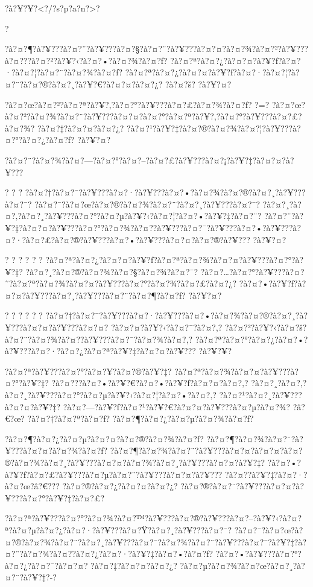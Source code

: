 \documentclass[11pt, openany]{book}
\begin{document}
{{{{{{{{{{{{{{{{{?à?¥?¥?\textless{}?/?s?p?a?n?\textgreater{}?

?

?à?¤?¶?à?¥???à?¤?¨?à?¥???à?¤?§?à?¤?¨?à?¥???à?¤?¤?à?¤?¾?à?¤?²?à?¥???à?¤???à?¤?²?à?¥?‹?à?¤?•?à?¤?¾?à?¤?ƒ?
?à?¤?ª?à?¤?¿?à?¤?¤?à?¥?ƒ?à?¤?·?à?¤?¦?à?¤?¨?à?¤?¾?à?¤?ƒ?
?à?¤?ª?à?¤?¿?à?¤?¤?à?¥?ƒ?à?¤?·?à?¤?¦?à?¤?¨?à?¤?®?à?¤?¸?à?¥?€?à?¤?¤?à?¤?¿?
?à?¤?š? ?à?¥?¤?

?à?¤?œ?à?¤?²?à?¤?ª?à?¥?‚?à?¤?°?à?¥???à?¤?£?à?¤?¾?à?¤?ƒ? ?=?
?à?¤?œ?à?¤?²?à?¤?¾?à?¤?¨?à?¥???à?¤?¤?à?¤?°?à?¤?ª?à?¥?‚?à?¤?°?à?¥???à?¤?£?à?¤?¾?
?à?¤?‡?à?¤?¤?à?¤?¿?
?à?¤?¹?à?¥?‡?à?¤?®?à?¤?¾?à?¤?¦?à?¥???à?¤?°?à?¤?¿?à?¤?ƒ? ?à?¥?¤?

?à?¤?¨?à?¤?¾?à?¤?---?à?¤?°?à?¤?--?à?¤?£?à?¥???à?¤?¡?à?¥?‡?à?¤?¤?à?¥???

? ? ?
?à?¤?†?à?¤?¯?à?¥???à?¤?·?à?¥???à?¤?•?à?¤?¾?à?¤?®?à?¤?¸?à?¥???à?¤?¯?
?à?¤?¯?à?¤?œ?à?¤?®?à?¤?¾?à?¤?¨?à?¤?¸?à?¥???à?¤?¯?
?à?¤?¸?à?¤?‚?à?¤?¸?à?¥???à?¤?°?à?¤?µ?à?¥?‹?à?¤?¦?à?¤?•?à?¥?‡?à?¤?¨?
?à?¤?¨?à?¥?‡?à?¤?¤?à?¥???à?¤?°?à?¤?¾?à?¤?­?à?¥???à?¤?¯?à?¥???à?¤?•?à?¥???à?¤?·?à?¤?£?à?¤?®?à?¥???à?¤?•?à?¥???à?¤?¤?à?¤?®?à?¥???
?à?¥?¤?

? ? ? ? ? ?
?à?¤?ª?à?¤?¿?à?¤?¤?à?¥?ƒ?à?¤?ª?à?¤?¾?à?¤?¤?à?¥???à?¤?°?à?¥?‡?
?à?¤?¸?à?¤?®?à?¤?¾?à?¤?§?à?¤?¾?à?¤?¯?
?à?¤?\ldots{}?à?¤?°?à?¥???à?¤?˜?à?¤?ª?à?¤?¾?à?¤?¤?à?¥???à?¤?°?à?¤?¾?à?¤?£?à?¤?¿?
?à?¤?•?à?¥?ƒ?à?¤?¤?à?¥???à?¤?¸?à?¥???à?¤?¨?à?¤?¶?à?¤?ƒ? ?à?¥?¤?

? ? ? ? ? ?
?à?¤?†?à?¤?¯?à?¥???à?¤?·?à?¥???à?¤?•?à?¤?¾?à?¤?®?à?¤?¸?à?¥???à?¤?¤?à?¥???à?¤?¤?
?à?¤?¤?à?¥?‹?à?¤?¯?à?¤?‚?
?à?¤?²?à?¥?‹?à?¤?š?à?¤?¨?à?¤?¾?à?¤?­?à?¥???à?¤?¯?à?¤?¾?à?¤?‚?
?à?¤?ª?à?¤?°?à?¤?¿?à?¤?•?à?¥???à?¤?·?à?¤?¿?à?¤?ª?à?¥?‡?à?¤?¤?à?¥???
?à?¥?¥?

?à?¤?ª?à?¥???à?¤?°?à?¤?¥?à?¤?®?à?¥?‡?
?à?¤?ª?à?¤?¾?à?¤?¤?à?¥???à?¤?°?à?¥?‡?
?à?¤???à?¤?•?à?¥?€?à?¤?•?à?¥?ƒ?à?¤?¤?à?¤?‚?
?à?¤?¸?à?¤?‚?à?¤?¸?à?¥???à?¤?°?à?¤?µ?à?¥?‹?à?¤?¦?à?¤?•?à?¤?‚?
?à?¤?¹?à?¤?¸?à?¥???à?¤?¤?à?¥?‡?
?à?¤?---?à?¥?ƒ?à?¤?¹?à?¥?€?à?¤?¤?à?¥???à?¤?µ?à?¤?¾? ?â?€?œ?
?à?¤?†?à?¤?ª?à?¤?ƒ? ?à?¤?¶?à?¤?¿?à?¤?µ?à?¤?¾?à?¤?ƒ?

?à?¤?¶?à?¤?¿?à?¤?µ?à?¤?¤?à?¤?®?à?¤?¾?à?¤?ƒ?
?à?¤?¶?à?¤?¾?à?¤?¨?à?¥???à?¤?¤?à?¤?¾?à?¤?ƒ?
?à?¤?¶?à?¤?¾?à?¤?¨?à?¥???à?¤?¤?à?¤?¤?à?¤?®?à?¤?¾?à?¤?¸?à?¥???à?¤?¤?à?¤?¾?à?¤?¸?à?¥???à?¤?¤?à?¥?‡?
?à?¤?•?à?¥?ƒ?à?¤?£?à?¥???à?¤?µ?à?¤?¨?à?¥???à?¤?¤?à?¥???
?à?¤?­?à?¥?‡?à?¤?·?à?¤?œ?â?€??? ?à?¤?®?à?¤?¿?à?¤?¤?à?¤?¿?
?à?¤?®?à?¤?¨?à?¥???à?¤?¤?à?¥???à?¤?°?à?¥?‡?à?¤?£?

?à?¤?ª?à?¥???à?¤?°?à?¤?¾?à?¤?™?à?¥???à?¤?®?à?¥???à?¤?--?à?¥?‹?à?¤?ª?à?¤?µ?à?¤?¿?à?¤?·?à?¥???à?¤?Ÿ?à?¤?¸?à?¥???à?¤?¯?
?à?¤?¯?à?¤?œ?à?¤?®?à?¤?¾?à?¤?¨?à?¤?¸?à?¥???à?¤?¯?à?¤?¾?à?¤?¨?à?¥???à?¤?¯?à?¥?‡?à?¤?¨?à?¤?¾?à?¤?­?à?¤?¿?à?¤?·?à?¥?‡?à?¤?•?à?¤?ƒ?
?à?¤?•?à?¥???à?¤?°?à?¤?¿?à?¤?¯?à?¤?¤? ?à?¤?‡?à?¤?¤?à?¤?¿?
?à?¤?µ?à?¤?¾?à?¤?œ?à?¤?¸?à?¤?¨?à?¥?‡?-?

}}}}}}}}}}}}}}}}}
\end{document}
